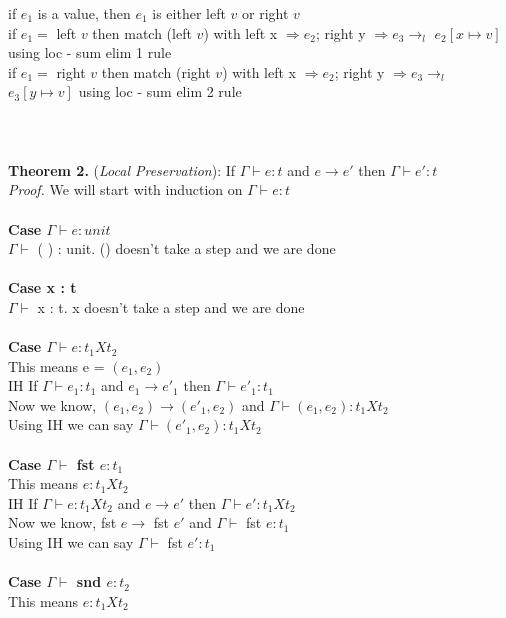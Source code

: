 \documentclass{article}
\begin{document}
if $e_1$ is a value, then $e_1$ is either left $v$ or right $v$\\
if $e_1 = $ left $v$ then match (left $v$) with left x $\Rightarrow e_2$; right y $\Rightarrow e_3 \to_l$ $e_2[x \mapsto v]$ using loc - sum elim 1 rule\\
if $e_1 = $ right $v$ then match (right $v$) with left x $\Rightarrow e_2$; right y $\Rightarrow e_3 \to_l$ $e_3[y \mapsto v]$ using loc - sum elim 2 rule\\
\\\\ 
\\
\textbf{Theorem 2.} (\textit{Local Preservation}): If $\Gamma \vdash e : t$ and  $e \to e'$ then $\Gamma \vdash e' : t$
  \\
\textit{Proof.} We will start with induction on $\Gamma \vdash e : t$ \\\\
\textbf{Case $\Gamma \vdash e : unit$} \\
 $\Gamma \vdash $ ( ) : unit. () doesn't take a step and we are done \\ \\
\textbf{Case x : t}      \\ 
$\Gamma \vdash $ x : t. x doesn't take a step and we are done \\ \\
\textbf{Case $\Gamma \vdash e : t_1 X t_2$ } \\
This means e = $(e_1, e_2)$ \\
IH If $\Gamma \vdash e_1 : t_1$ and  $e_1 \to e'_1$ then $\Gamma \vdash e'_1 : t_1$ \\
Now we know, $(e_1,e_2) \to (e'_1, e_2)$ and $\Gamma \vdash (e_1, e_2) : t_1 X t_2$ \\
Using IH we can say $\Gamma \vdash (e'_1, e_2) : t_1 X t_2$ \\\\
\textbf{Case $\Gamma \vdash$ fst $e : t_1$ } \\
This means $e : t_1Xt_2$ \\
IH If $\Gamma \vdash e : t_1Xt_2$ and  $e \to e'$ then $\Gamma \vdash e' : t_1Xt_2$ \\
Now we know, fst $e \to$ fst $e'$ and $\Gamma \vdash$ fst $e : t_1$ \\
Using IH we can say $\Gamma \vdash$ fst $ e' : t_1$ \\\\
\textbf{Case $\Gamma \vdash$ snd $e : t_2$ } \\
This means $e : t_1Xt_2$ \\
\end{document}
